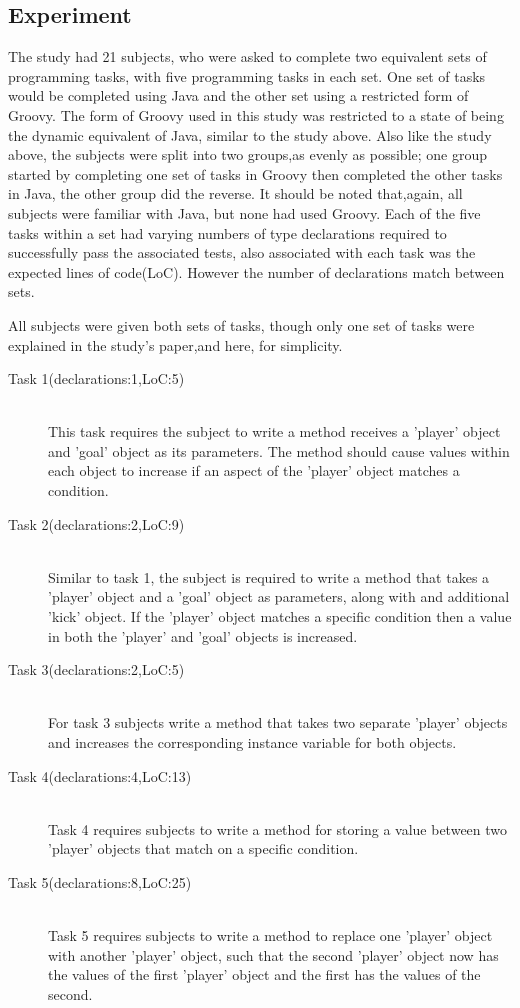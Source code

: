 \documentclass{sig-alternate}
\begin{document}
\subsection{Experiment}
The study had 21 subjects, who were asked to complete two equivalent sets of programming tasks, with five programming tasks in each set. One set of tasks would be completed using Java and the other set using a restricted form of Groovy. The form of Groovy used in this study was restricted to a state of being the dynamic equivalent of Java, similar to the study above. Also like the study above, the subjects were split into two groups,as evenly as possible; one group started by completing one set of tasks in Groovy then completed the other tasks in Java, the other group did the reverse. It should be noted that,again, all subjects were familiar with Java, but none had used Groovy. Each of the five tasks within a set had varying numbers of type declarations required to successfully pass the associated tests, also associated with each task was the expected lines of code(LoC). However the number of declarations match between sets. 

All subjects were given both sets of tasks, though only one set of tasks were explained in the study's paper,and here, for simplicity.
\begin{description}
\item[Task 1(declarations:1,LoC:5)]\hfill \\
This task requires the subject to write a method receives a 'player' object and 'goal' object as its parameters. The method should cause values within each object to increase if an aspect of the 'player' object matches a condition.
\item[Task 2(declarations:2,LoC:9)]\hfill \\
Similar to task 1, the subject is required to write a method that takes a 'player' object and a 'goal' object as parameters, along with and additional 'kick' object. If the 'player' object  matches a specific condition then a value in both the 'player' and 'goal' objects is increased.  
\item[Task 3(declarations:2,LoC:5)]\hfill \\
For task 3 subjects write a method that takes two separate 'player' objects and increases the corresponding instance variable for both objects.
\item[Task 4(declarations:4,LoC:13)]\hfill \\
Task 4 requires subjects to write a method for storing a value between two 'player' objects that match on a specific condition. 
\item[Task 5(declarations:8,LoC:25)]\hfill \\
Task 5 requires subjects to write a method to replace one 'player' object with another 'player' object, such that the second 'player' object now has the values of the first 'player' object and the first has the values of the second.
\end{description}
 
\end{document}
